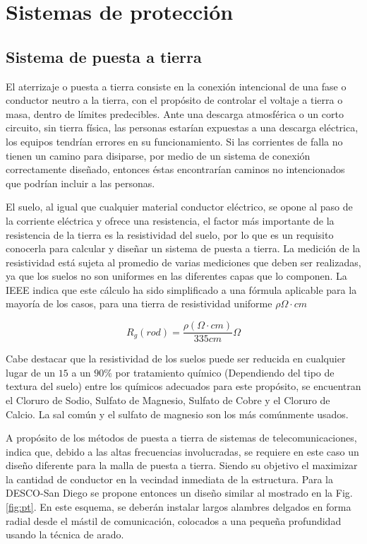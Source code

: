 \documentclass[11pt, a4paper, twosides]{report}
\begin{document}
\chapter{Sistemas de protección}

\section{Sistema de puesta a tierra}
El aterrizaje o puesta a tierra consiste en la conexión intencional de una fase o conductor neutro a la tierra, con el propósito de controlar el voltaje a tierra o masa, dentro de límites predecibles\cite{howell82}. Ante una descarga atmosférica o un corto circuito, sin tierra física, las personas estarían expuestas a una descarga eléctrica, los equipos tendrían errores en su funcionamiento. Si las corrientes de falla no tienen un camino para disiparse, por medio de un sistema de conexión correctamente diseñado, entonces éstas encontrarían caminos no intencionados que podrían incluir a las personas\cite{montiel2005}.

El suelo, al igual que cualquier material conductor eléctrico, se opone al paso de la corriente eléctrica y ofrece una resistencia, el factor más importante de la resistencia de la tierra es la resistividad del suelo, por lo que es un requisito conocerla para calcular y diseñar un sistema de puesta a tierra. La medición de la resistividad está sujeta al promedio de varias mediciones que deben ser realizadas, ya que los suelos no son uniformes en las diferentes capas que lo componen. La IEEE\cite{howell82} indica que este cálculo ha sido simplificado a una fórmula aplicable para la mayoría de los casos, para una tierra de resistividad uniforme $\rho \Omega \cdot cm$ 

\begin{equation}
    R_{g}(rod) = \frac{\rho (\Omega \cdot cm)}{335 cm} \Omega
\end{equation}

Cabe destacar que la resistividad de los suelos puede ser reducida en cualquier lugar de un $15$ a un $90 \%$ por tratamiento químico (Dependiendo del tipo de textura del suelo) entre los químicos adecuados para este propósito, se encuentran el Cloruro de Sodio, Sulfato de Magnesio, Sulfato de Cobre y el Cloruro de Calcio. La sal común y el sulfato de magnesio son los más comúnmente usados.

A propósito de los métodos de puesta a tierra de sistemas de telecomunicaciones,  indica que, debido a las altas frecuencias involucradas, se requiere en este caso un diseño diferente para la malla de puesta a tierra. Siendo su objetivo el maximizar la cantidad de conductor en la vecindad inmediata de la estructura. Para la DESCO-San Diego se propone entonces un diseño similar al mostrado en la Fig. \ref{fig:pt}.  En este esquema\cite{bautista2015}, se deberán instalar largos alambres delgados en forma radial desde el mástil de comunicación, colocados a una pequeña profundidad usando la técnica de arado. 
\end{document}
